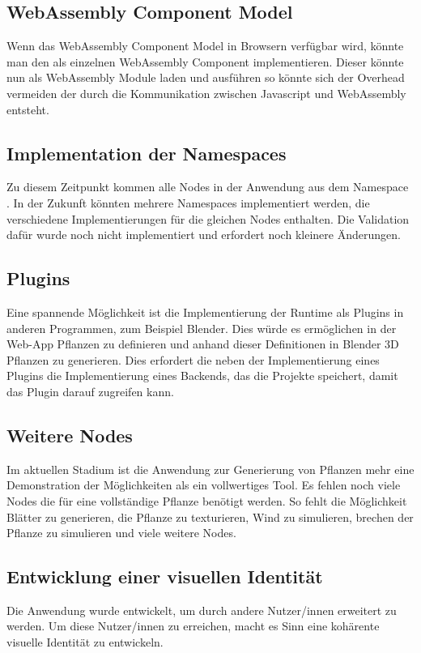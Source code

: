 \documentclass[ngerman]{article}
\begin{document}
\subsection*{WebAssembly Component Model}
Wenn das WebAssembly Component Model in Browsern verfügbar wird, könnte man den  als einzelnen WebAssembly Component implementieren. Dieser könnte nun  als WebAssembly Module laden und ausführen so könnte sich der Overhead vermeiden der durch die Kommunikation zwischen Javascript und WebAssembly entsteht.

\subsection*{Implementation der Namespaces}
Zu diesem Zeitpunkt kommen alle Nodes in der Anwendung aus dem Namespace . In der Zukunft könnten mehrere Namespaces implementiert werden, die verschiedene Implementierungen für die gleichen Nodes enthalten. Die Validation dafür wurde noch nicht implementiert und erfordert noch kleinere Änderungen.

\subsection*{Plugins}
Eine spannende Möglichkeit ist die Implementierung der Runtime als Plugins in anderen Programmen, zum Beispiel Blender. Dies würde es ermöglichen in der Web-App Pflanzen zu definieren und anhand dieser Definitionen in Blender 3D Pflanzen zu generieren. Dies erfordert die neben der Implementierung eines Plugins die Implementierung eines Backends, das die Projekte speichert, damit das Plugin darauf zugreifen kann.

\subsection*{Weitere Nodes}
Im aktuellen Stadium ist die Anwendung zur Generierung von Pflanzen mehr eine Demonstration der Möglichkeiten als ein vollwertiges Tool. Es fehlen noch viele Nodes die für eine vollständige Pflanze benötigt werden. So fehlt die Möglichkeit Blätter zu generieren, die Pflanze zu texturieren, Wind zu simulieren, brechen der Pflanze zu simulieren und viele weitere Nodes.

\subsection*{Entwicklung einer visuellen Identität}
Die Anwendung wurde entwickelt, um durch andere Nutzer/innen erweitert zu werden. 
Um diese Nutzer/innen zu erreichen, macht es Sinn eine kohärente visuelle Identität zu entwickeln.
\end{document}
